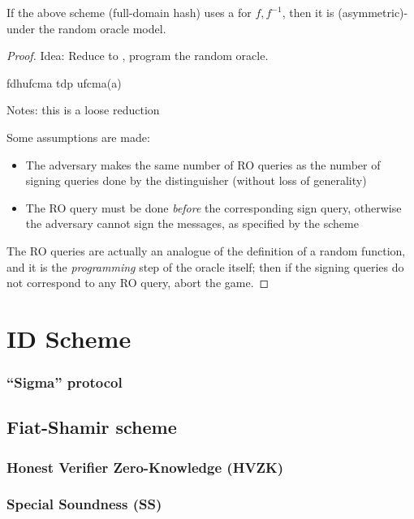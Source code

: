 \begin{theorem}
    If the above scheme (full-domain hash) uses a \tdp{} for $f, f^{-1}$, then it is (asymmetric)-\ufcma under the random oracle model.
\end{theorem}

\begin{proof}
    Idea: Reduce to \tdp, program the random oracle.

    \begin{cryptoredux}
        {fdhufcma}
        {}
        {tdp}
        {ufcma(a)}



        \cseqdelay
        \cseqbeginloop
        \invoke{}{$\sigma$}{}
        \cseqendloop
        \cseqdelay


        \send{}{$\sigma^*$}{}
    \end{cryptoredux}

    Notes: this is a loose reduction

    Some assumptions are made:

    \begin{itemize}
        \item The adversary makes the same number of RO queries as the number of signing queries done by the distinguisher (without loss of generality)
        \item The RO query must be done \emph{before} the corresponding sign query, otherwise the adversary cannot sign the messages, as specified by the scheme
    \end{itemize}

    The RO queries are actually an analogue of the definition of a random function, and it is the \emph{programming} step of the oracle itself; then if the signing queries do not correspond to any RO query, abort the game.

\end{proof}

\section{ID Scheme}

\subsubsection{``Sigma'' protocol}

\subsection{Fiat-Shamir scheme}

\subsubsection{Honest Verifier Zero-Knowledge (HVZK)}

\subsubsection{Special Soundness (SS)}
